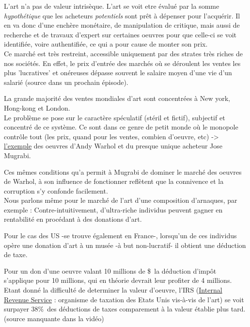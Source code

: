 \documentclass{article}
\begin{document}
L'art n'a pas de valeur intrisèque.
L'art se voit etre évalué par la somme \emph{hypothétique} que les acheteurs \emph{potentiels} sont prêt à dépenser pour l'acquérir. Il en va donc d'une enchère monétaire, de manipulation de critique, mais aussi de recherche et de travaux d'expert sur certaines oeuvres pour que celle-ci se voit identifiée, voire authentifiée, ce qui a pour cause de monter son prix.
\\

Ce marché est très restreint, accessible uniquement par des strates très riches de nos sociétés. En effet, le prix d'entrée des marchés où se déroulent les ventes les plus 'lucratives' et onéreuses dépasse souvent le salaire moyen d'une vie d'un salarié (source dans un prochain épisode).

La grande majorité des ventes mondiales d'art sont concentrées à New york, Hong-kong et London.
\\

Le problème se pose sur le caractère spéculatif (stéril et fictif), subjectif et concentré de ce système. Ce sont dans ce genre de petit monde où le monopole contrôle tout (les prix, quand pour les ventes, combien d'oeuvre, etc) -> \href{https://youtu.be/ZZ3F3zWiEmc?t=895}{l'exemple} des oeuvres d'Andy Warhol et du presque unique acheteur Jose Mugrabi.

Ces mêmes conditions qu'a permit à Mugrabi de dominer le marché des oeuvres de Warhol, à son influence de fonctionner reflètent que la connivence et la corruption s'y confonde facilement.
\\

Nous parlons même pour le marché de l'art d'une composition d'arnaques, par exemple : \newline
Contre-intuitivement, d'ultra-riche individus peuvent gagner en rentabilité en procédant à des donations d'art.

    Pour le cas des US -se trouve également en France-, lorsqu'un de ces individus opère une donation d'art à un musée -à but non-lucratif- il obtient une déduction de taxe.
    
        Pour un don d'une oeuvre valant 10 millions de \$\, la déduction d'impôt s'applique pour 10 millions, qui en théorie devrait leur profiter de 4 millions.
    Etant donné la difficulté de determiner la valeur d'oeuvre, l'IRS (\href{https://www.irs.gov/about-irs}{Internal Revenue Service} : organisme de taxation des Etats Unis vis-à-vis de l'art) se voit surpayer 38\%\ des déductions de taxes comparement à la valeur établie plus tard. (source manquante dans la vidéo)
    
\end{document}
